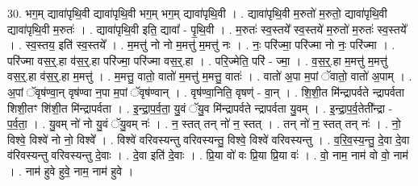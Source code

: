 \documentclass[17pt]{extarticle}
\begin{document}
30. भग॒म् द्यावा॑पृथि॒वी द्यावा॑पृथि॒वी भग॒म् भग॒म् द्यावा॑पृथि॒वी । . द्यावा॑पृथि॒वी म॒रुतो॑ म॒रुतो॒ द्यावा॑पृथि॒वी द्यावा॑पृथि॒वी म॒रुतः॑ । . द्यावा॑पृथि॒वी इति॒ द्यावा᳚ - पृ॒थि॒वी । . म॒रुतः॑ स्व॒स्तये᳚ स्व॒स्तये॑ म॒रुतो॑ म॒रुतः॑ स्व॒स्तये᳚ । . स्व॒स्तय॒ इति॑ स्व॒स्तये᳚ । . म॒मत्तु॑ नो नो म॒मत्तु॑ म॒मत्तु॑ नः । . नः॒ परि॑ज्मा॒ परि॑ज्मा नो नः॒ परि॑ज्मा । . परि॑ज्मा वस॒र्॒.हा व॑स॒र्॒.हा परि॑ज्मा॒ परि॑ज्मा वस॒र्॒.हा । . परि॒ज्मेति॒ परि॑ - ज्मा॒ । . व॒स॒र्॒.हा म॒मत्तु॑ म॒मत्तु॑ वस॒र्॒.हा व॑स॒र्॒.हा म॒मत्तु॑ । . म॒मत्तु॒ वातो॒ वातो॑ म॒मत्तु॑ म॒मत्तु॒ वातः॑ । . वातो॑ अ॒पा म॒पां ॅवातो॒ वातो॑ अ॒पाम् । . अ॒पां ॅवृष॑ण्वा॒न् वृष॑ण्वा न॒पा म॒पां ॅवृष॑ण्वान् । . वृष॑ण्वा॒निति॒ वृषण्॑ - वा॒न् । . शि॒शी॒त मि॑न्द्रापर्वते न्द्रापर्वता शिशी॒तꣳ शि॑शी॒त मि॑न्द्रापर्वता । . इ॒न्द्रा॒प॒र्व॒ता॒ यु॒वं ॅयु॒व मि॑न्द्रापर्वते न्द्रापर्वता यु॒वम् । . इ॒न्द्रा॒प॒र्व॒तेती᳚न्द्रा - प॒र्व॒ता॒ । . यु॒वम् नो॑ नो यु॒वं ॅयु॒वम् नः॑ । . न॒ स्तत् तन् नो॑ न॒ स्तत् । . तन् नो॑ न॒ स्तत् तन् नः॑ । . नो॒ विश्वे॒ विश्वे॑ नो नो॒ विश्वे᳚ । . विश्वे॑ वरिवस्यन्तु वरिवस्यन्तु॒ विश्वे॒ विश्वे॑ वरिवस्यन्तु । . व॒रि॒व॒स्य॒न्तु॒ दे॒वा दे॒वा व॑रिवस्यन्तु वरिवस्यन्तु दे॒वाः । . दे॒वा इति॑ दे॒वाः । . प्रि॒या वो॑ वः प्रि॒या प्रि॒या वः॑ । . वो॒ नाम॒ नाम॑ वो वो॒ नाम॑ । . नाम॑ हुवे हुवे॒ नाम॒ नाम॑ हुवे । \newline
\end{document}
